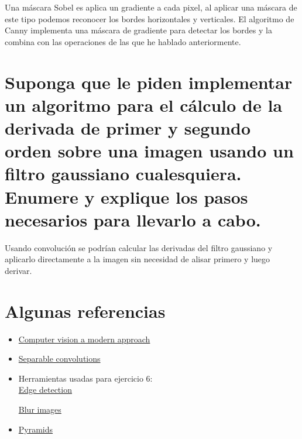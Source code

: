 \documentclass{article}
\begin{document}
Una máscara Sobel es aplica un gradiente a cada pixel, al aplicar una máscara de este tipo podemos reconocer los bordes horizontales y verticales. El algoritmo de Canny implementa una máscara de gradiente para detectar los bordes y la combina con las operaciones de las que he hablado anteriormente.


\section{Suponga que le piden implementar un algoritmo para el cálculo de la derivada de primer y segundo orden sobre una imagen usando un filtro gaussiano cualesquiera. Enumere y explique los pasos necesarios para llevarlo a cabo.}
Usando convolución se podrían calcular las derivadas del filtro gaussiano y aplicarlo directamente a la imagen sin necesidad de alisar primero y luego derivar.


\section{Algunas referencias}
\begin{itemize}
\item\href{http://cmuems.com/excap/readings/forsyth-ponce-computer-vision-a-modern-approach.pdf}{Computer vision a modern approach}

\item\href{https://towardsdatascience.com/a-basic-introduction-to-separable-convolutions-b99ec3102728}{Separable convolutions}


\item Herramientas usadas para ejercicio 6:\\
\href{https://pinetools.com/image-edge-detection}{Edge detection}

\href{https://pinetools.com/blur-image}{Blur images}

\item \href{https://ece.uwaterloo.ca/~nnikvand/Coderep/Codes%20for%20QoMeX%202011%20paper/iwssimcode/matlabPyrTools/TUTORIALS/pyramids.html#9}{Pyramids}


\end{itemize}
\end{document}

